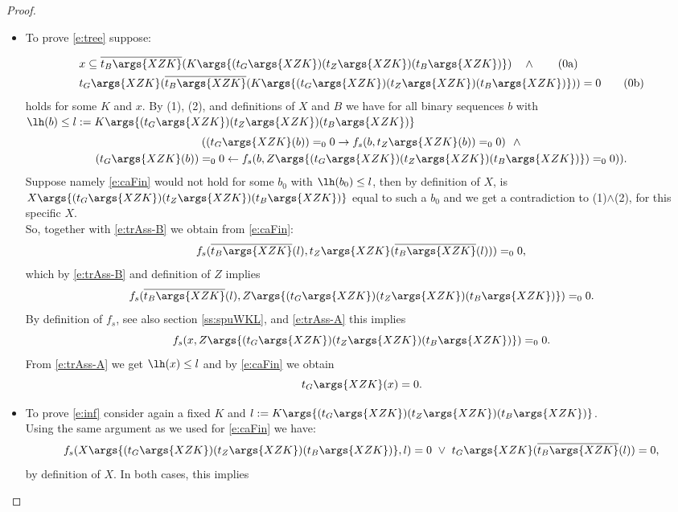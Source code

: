 \begin{proof}
\begin{itemize}
\item To prove \eqref{e:tree} suppose:
\addtocounter{equation}{1}
\begin{align*}
&x\subseteq 
       \overline{t_B\args{XZK}}(K\args{ (t_G\args{XZK}) (t_Z\args{XZK}) (t_B\args{XZK}) } ) 
      \quad \wedge \tag{\arabic{equation}a}\label{e:trAss-A}\\
&t_G\args{XZK}
       (\overline{t_B\args{XZK}}(K\args{ (t_G\args{XZK}) (t_Z\args{XZK}) (t_B\args{XZK}) } ))=0
                   \tag{\arabic{equation}b}\label{e:trAss-B}
\end{align*}
holds for some $K$ and $x$. By (1), (2), and definitions of $X$ and $B$ we have
for all binary sequences $b$ with $\lh(b)
  \leq l:=K\args{
    (t_G\args{XZK})
    (t_Z\args{XZK})
    (t_B\args{XZK})
   }$
\begin{multline}
      ((t_G\args{ XZK} (b) )=_00 \rightarrow f_s( b, t_Z \args{ XZK}(b) )=_00 )\ \ \wedge\\
      (t_G\args{ XZK } (b) )=_00 \leftarrow f_s( b, Z\args{
        (t_G\args{XZK})
        (t_Z\args{XZK})
        (t_B\args{XZK})
       }  )=_00 ))
\label{e:caFin}
\text{.}
\end{multline}
Suppose namely \eqref{e:caFin} would not hold for some $b_0$ with $\lh(b_0)\leq l$, then by definition of
$X$, is $X\args{(t_G\args{XZK})(t_Z\args{XZK})(t_B\args{XZK})}$ equal to such a $b_0$ 
and we get a contradiction to (1)$\wedge$(2), for this specific $X$.\\
So, together with \eqref{e:trAss-B} we obtain from \eqref{e:caFin}:
\[
f_s( \overline{t_B\args{XZK}}(l), t_Z \args{ XZK}(\overline{t_B\args{XZK}}(l)) )=_00
\text{,}
\]
which by \eqref{e:trAss-B} and definition of $Z$ implies
\[
f_s( \overline{t_B\args{XZK}}(l), Z\args{(t_G\args{XZK})(t_Z\args{XZK})(t_B\args{XZK})} )=_00
\text{.}
\]
By definition of $f_s$, see also section \ref{ss:spuWKL}, and \eqref{e:trAss-A} this implies
\[
f_s( x, Z\args{(t_G\args{XZK})(t_Z\args{XZK})(t_B\args{XZK})} )=_00
\text{.}
\]
From \eqref{e:trAss-A} we get $\lh(x)\leq l$ and by  \eqref{e:caFin} we obtain
\[
t_G\args{XZK}(x)=0
\text{.}
\]
\item To prove \eqref{e:inf} consider again a fixed $K$ and $l:=K\args{
    (t_G\args{XZK})
    (t_Z\args{XZK})
    (t_B\args{XZK})
   }$.\\
Using the same argument as we used for \eqref{e:caFin} we have:
\[
f_s(
  X\args{(t_G\args{XZK})(t_Z\args{XZK})(t_B\args{XZK})} , 
  l
 ) = 0
\ \vee \ 
t_G\args{XZK}( \overline{t_B\args{XZK}}(l) ) = 0
\text{,}
\]
by definition of $X$. In both cases, this implies 

\end{itemize}
\end{proof}
